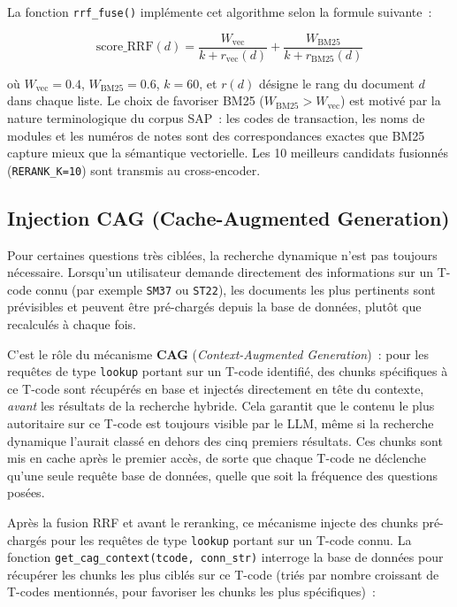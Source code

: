 La fonction \texttt{rrf\_fuse()} implémente cet algorithme selon la formule suivante~:

\begin{equation}
  \text{score\_RRF}(d) = \frac{W_{\text{vec}}}{k + r_{\text{vec}}(d)} + \frac{W_{\text{BM25}}}{k + r_{\text{BM25}}(d)}
  \label{eq:rrf}
\end{equation}

où $W_{\text{vec}} = 0.4$, $W_{\text{BM25}} = 0.6$, $k = 60$, et $r(d)$ désigne le rang du document $d$ dans chaque liste. Le choix de favoriser BM25 ($W_{\text{BM25}} > W_{\text{vec}}$) est motivé par la nature terminologique du corpus SAP~: les codes de transaction, les noms de modules et les numéros de notes sont des correspondances exactes que BM25 capture mieux que la sémantique vectorielle. Les 10 meilleurs candidats fusionnés (\texttt{RERANK\_K=10}) sont transmis au cross-encoder.


\subsection{Injection CAG (Cache-Augmented Generation)}

Pour certaines questions très ciblées, la recherche dynamique n'est pas toujours nécessaire. Lorsqu'un utilisateur demande directement des informations sur un T-code connu (par exemple \texttt{SM37} ou \texttt{ST22}), les documents les plus pertinents sont prévisibles et peuvent être pré-chargés depuis la base de données, plutôt que recalculés à chaque fois.

C'est le rôle du mécanisme \textbf{CAG} (\textit{Context-Augmented Generation})~: pour les requêtes de type \texttt{lookup} portant sur un T-code identifié, des chunks spécifiques à ce T-code sont récupérés en base et injectés directement en tête du contexte, \emph{avant} les résultats de la recherche hybride. Cela garantit que le contenu le plus autoritaire sur ce T-code est toujours visible par le LLM, même si la recherche dynamique l'aurait classé en dehors des cinq premiers résultats. Ces chunks sont mis en cache après le premier accès, de sorte que chaque T-code ne déclenche qu'une seule requête base de données, quelle que soit la fréquence des questions posées.

Après la fusion RRF et avant le reranking, ce mécanisme injecte des chunks pré-chargés pour les requêtes de type \texttt{lookup} portant sur un T-code connu. La fonction \texttt{get\_cag\_context(tcode, conn\_str)} interroge la base de données pour récupérer les chunks les plus ciblés sur ce T-code (triés par nombre croissant de T-codes mentionnés, pour favoriser les chunks les plus spécifiques)~:

